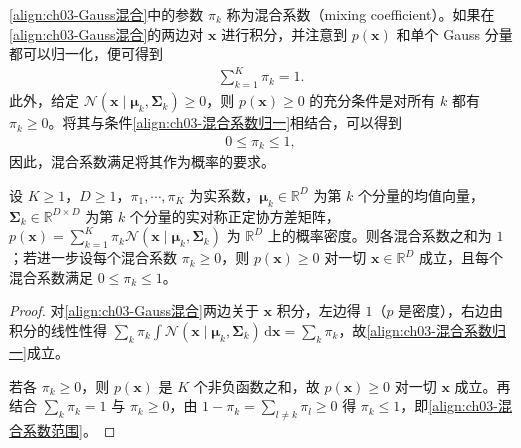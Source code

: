 \documentclass[../../main.tex]{subfiles}
\begin{document}
\eqref{align:ch03-Gauss混合}中的参数 $\pi_{k}$ 称为混合系数（mixing coefficient）。如果在\eqref{align:ch03-Gauss混合}的两边对 $\boldsymbol{x}$ 进行积分，并注意到 $p(\boldsymbol{x})$ 和单个 Gauss 分量都可以归一化，便可得到
\begin{align}
\sum_{k=1}^{K}\pi_{k}=1.
\label{align:ch03-混合系数归一}
\end{align}
此外，给定 $\mathcal{N}(\boldsymbol{x}\mid\boldsymbol{\mu}_{k},\boldsymbol{\Sigma}_{k})\geqslant0$，则 $p(\boldsymbol{x})\geqslant0$ 的充分条件是对所有 $k$ 都有 $\pi_{k}\geqslant0$。将其与条件\eqref{align:ch03-混合系数归一}相结合，可以得到
\begin{align}
0\leqslant\pi_{k}\leqslant1,
\label{align:ch03-混合系数范围}
\end{align}
因此，混合系数满足将其作为概率的要求。

\begin{proposition}[混合系数的归一性与取值范围]\label{proposition:ch03-混合系数}
设 $K\geqslant1$，$D\geqslant1$，$\pi_1,\cdots,\pi_K$ 为实系数，$\boldsymbol{\mu}_k\in\mathbb{R}^{D}$ 为第 $k$ 个分量的均值向量，$\boldsymbol{\Sigma}_k\in\mathbb{R}^{D\times D}$ 为第 $k$ 个分量的实对称正定协方差矩阵，$p(\boldsymbol{x})=\sum_{k=1}^{K}\pi_{k}\mathcal{N}(\boldsymbol{x}\mid\boldsymbol{\mu}_k,\boldsymbol{\Sigma}_k)$ 为 $\mathbb{R}^{D}$ 上的概率密度。则各混合系数之和为 $1$；若进一步设每个混合系数 $\pi_k\geqslant0$，则 $p(\boldsymbol{x})\geqslant0$ 对一切 $\boldsymbol{x}\in\mathbb{R}^{D}$ 成立，且每个混合系数满足 $0\leqslant\pi_k\leqslant1$。
\end{proposition}
\begin{proof}
对\eqref{align:ch03-Gauss混合}两边关于 $\boldsymbol{x}$ 积分，左边得 $1$（$p$ 是密度），右边由积分的线性性得 $\sum_k\pi_k\int\mathcal{N}(\boldsymbol{x}\mid\boldsymbol{\mu}_k,\boldsymbol{\Sigma}_k)\,\mathrm{d}\boldsymbol{x}=\sum_k\pi_k$，故\eqref{align:ch03-混合系数归一}成立。

若各 $\pi_k\geqslant0$，则 $p(\boldsymbol{x})$ 是 $K$ 个非负函数之和，故 $p(\boldsymbol{x})\geqslant0$ 对一切 $\boldsymbol{x}$ 成立。再结合 $\sum_k\pi_k=1$ 与 $\pi_k\geqslant0$，由 $1-\pi_k=\sum_{l\neq k}\pi_l\geqslant0$ 得 $\pi_k\leqslant1$，即\eqref{align:ch03-混合系数范围}。
\end{proof}
\end{document}
